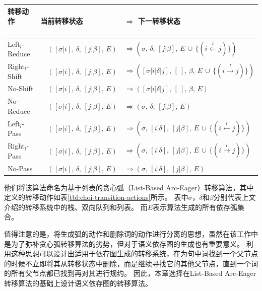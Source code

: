 \begin{table}[htbp]
	\vspace{0.5em}\centering\wuhao
	\begin{tabular}{lll}
		\toprule[1.5pt]
		转移动作 \ \ \ \ & 当前转移状态 & $\Rightarrow$ 下一转移状态 \\
		\midrule[1pt]
		Left$_l$-Reduce &\ \ $([\sigma|i],\,\delta,\,[j|\beta],\,E)$ & $\Rightarrow (\sigma,\,\delta,\,[j|\beta],\,E\,\cup\,\{(i\xleftarrow{l}j)\})$ \\
		Right$_l$-Shift &\ \ $([\sigma|i],\,\delta,\,[j|\beta],\,E)$ & $\Rightarrow ([\sigma|i|\delta|j],\,[\ ],\,\beta,\,E\,\cup\,\{(i\xrightarrow{l}j)\})$ \\
		No-Shift &\ \ $([\sigma|i],\,\delta,\,[j|\beta],\,E)$ & $\Rightarrow 
		([\sigma|i|\delta|j],\,[\ ],\,\beta,\,E)$ \\
		No-Reduce &\ \ $([\sigma|i],\,\delta,\,[j|\beta],\,E)$ & $\Rightarrow (\sigma,\,\delta,\,[j|\beta],\,E)$\\
		Left$_l$-Pass &\ \ $([\sigma|i],\,\delta,\,[j|\beta],\,E)$ & $\Rightarrow (\sigma,\,[i|\delta],\,[j|\beta],\,E\,\cup\,\{(i\xleftarrow{l}j)\})$\\
		Right$_l$-Pass &\ \ $([\sigma|i],\,\delta,\,[j|\beta],\,E)$ & $\Rightarrow (\sigma,\,[i|\delta],\,[j|\beta],\,E\,\cup\,\{(i\xrightarrow{l}j)\})$\\
		No-Pass &\ \ $([\sigma|i],\,\delta,\,[j|\beta],\,E)$ & $\Rightarrow (\sigma,\,[i|\delta]	,\,[j|\beta],\,E)$\\
		\bottomrule[1.5pt]
	\end{tabular}
\end{table}

他们将该算法命名为基于列表的贪心弧（List-Based Arc-Eager）转移算法，其中定义的转移动作如表\ref{tbl:choi-transition-actions}所示。
表中$\sigma$，$\delta$和$\beta$分别代表上文介绍的转移系统中的栈、双向队列和列表。
而$E$表示算法生成的所有依存弧集合。

值得注意的是，将生成弧的动作和删除词的动作进行分离的思想，虽然在该工作中是为了弥补贪心弧转移算法的劣势，但对于语义依存图的生成也有重要意义。
利用这种思想可以设计出适用于依存图生成的转移系统，在为句中词找到一个父节点的时候不立即将其从转移状态中删除，而是继续寻找它的其他父节点，直到一个词的所有父节点都已找到再对其进行规约。
因此，本章选择在List-Based Arc-Eager转移算法的基础上设计语义依存图的转移算法。

